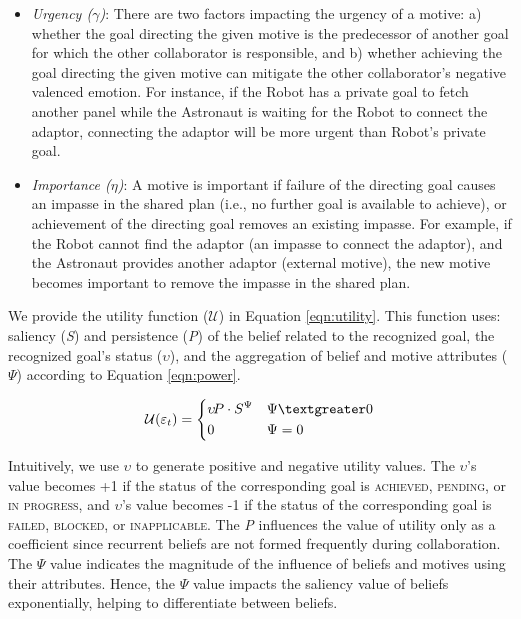 \begin{itemize}[leftmargin=2pt]
  \setlength\itemsep{1mm}
  \item \textit{Urgency ($\gamma$)}: There are two factors impacting the urgency
  of a motive: a) whether the goal directing the given motive is the predecessor of
  another goal for which the other collaborator is responsible, and b) whether
  achieving the goal directing the given motive can mitigate the other
  collaborator's negative valenced emotion. For instance, if the Robot has a
  private goal to fetch another panel while the Astronaut is waiting for the
  Robot to connect the adaptor, connecting the adaptor will be more urgent than
  Robot's private goal.
  \item \textit{Importance ($\eta$)}: A motive is important if failure of the
  directing goal causes an impasse in the shared plan (i.e., no further goal is
  available to achieve), or achievement of the directing goal removes an
  existing impasse. For example, if the Robot cannot find the adaptor (an
  impasse to connect the adaptor), and the Astronaut provides another adaptor
  (external motive), the new motive becomes important to remove the impasse in
  the shared plan.
\end{itemize}

We provide the utility function ($\mathcal{U}$) in Equation \ref{eqn:utility}.
This function uses: saliency (\textit{S}) and persistence (\textit{P}) of the
belief related to the recognized goal, the recognized goal's status
($\upsilon$), and the aggregation of belief and motive attributes ($\Psi$)
according to Equation \ref{eqn:power}.

\begin{equation}
    \mathcal{U}(\varepsilon_t)= 
    \begin{dcases}
       \upsilon\!P\cdot S^{\Psi} & \Psi \textgreater 0 \\
       0               			 & \Psi = 0
    \end{dcases}
    \label{eqn:utility}
\end{equation}

Intuitively, we use $\upsilon$ to generate positive and negative utility values.
The $\upsilon$'s value becomes +1 if the status of the corresponding goal is
\textsc{achieved}, \textsc{pending}, or \textsc{in progress}, and $\upsilon$'s
value becomes -1 if the status of the corresponding goal is \textsc{failed,
blocked}, or \textsc{inapplicable}. The \textit{P} influences the value of
utility only as a coefficient since recurrent beliefs are not formed frequently
during collaboration. The $\Psi$ value indicates the magnitude of the influence
of beliefs and motives using their attributes. Hence, the $\Psi$ value impacts
the saliency value of beliefs exponentially, helping to differentiate between
beliefs.

